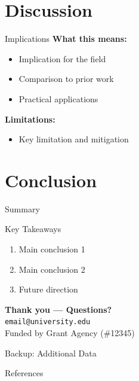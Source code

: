 \documentclass[aspectratio=169,11pt]{beamer}
\begin{document}
\section{Discussion}

\begin{frame}{Implications}
  \textbf{What this means:}
  \begin{itemize}
    \item Implication for the field
    \item Comparison to prior work \cite{prior2023}
    \item Practical applications
  \end{itemize}
  \vspace{0.5cm}
  \textbf{Limitations:}
  \begin{itemize}
    \item Key limitation and mitigation
  \end{itemize}
\end{frame}

\section{Conclusion}

\begin{frame}{Summary}
  \begin{exampleblock}{Key Takeaways}
    \begin{enumerate}
      \item Main conclusion 1
      \item Main conclusion 2
      \item Future direction
    \end{enumerate}
  \end{exampleblock}
  \vspace{0.5cm}
  \centering
  \textbf{Thank you — Questions?}\\
  \texttt{email@university.edu}\\[0.3cm]
  {\footnotesize Funded by Grant Agency (\#12345)}
\end{frame}

\appendix

\begin{frame}{Backup: Additional Data}
\end{frame}

\begin{frame}[allowframebreaks]{References}
  \printbibliography
\end{frame}
\end{document}
